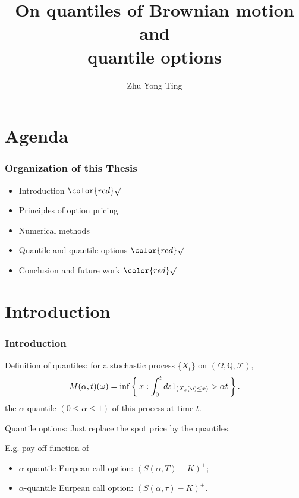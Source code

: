\documentclass[cjk]{beamer}
\begin{document}
\title{On quantiles of Brownian motion and \\
quantile options}
\author{Zhu Yong Ting}
\date{} \frame{\titlepage}

\section{Agenda}
\begin{frame}
\frametitle{Organization of this Thesis}

\begin{itemize}
\item Introduction  $\color{red}\surd$
\item Principles of option pricing 
\item Numerical methods
\item Quantile and quantile options $\color{red}\surd$
\item Conclusion and future work $\color{red}\surd$
\end{itemize}
\end{frame}

\section{Introduction} 
\begin{frame}
\frametitle{Introduction}
Definition of quantiles:
for a stochastic process \{$X_t$\} on $(\Omega, \mathbb Q, \mathcal F)$, \\
\[
M(\alpha,t)(\omega) = \inf\Set{x:\int_0^t ds1_{(X_s (\omega)\leq x)} > \alpha t}.
\]
the $\alpha$-quantile $(0 \leq \alpha \leq 1)$ of this process at time $t$.\newline


\pause
Quantile options:
Just replace the spot price by the quantiles.

\pause
E.g. pay off function of 
\begin{itemize}
\item 
$\alpha$-quantile Eurpean call option: $(S(\alpha,T)-K)^+$;
\item 
$\alpha$-quantile Eurpean call option: $(S(\alpha,\tau)-K)^+$.
\end{itemize}
\end{frame}
\end{document}
